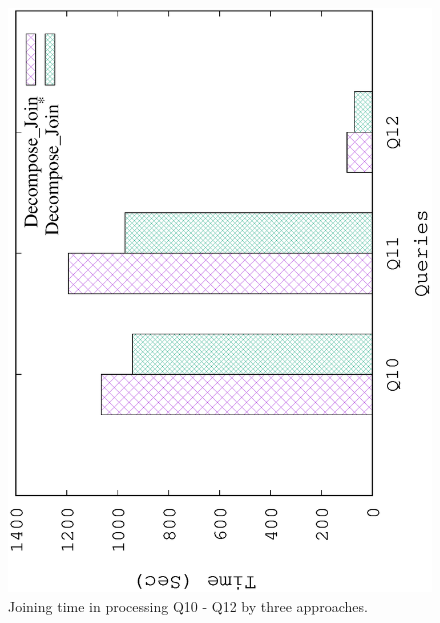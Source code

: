 \begin{figure}[H]
	\centering
	\includegraphics[scale=0.47, angle=270]{plot/threejoin.eps}
	\caption{Joining time in processing Q10 - Q12 by three approaches.}
	\label{fig:threejoin}
\end{figure}
